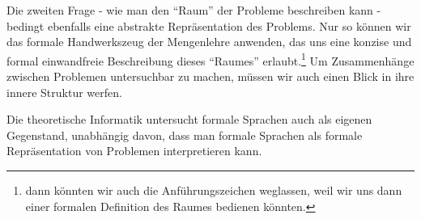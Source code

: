 Die zweiten Frage - wie man den ``Raum'' der Probleme beschreiben kann -
bedingt ebenfalls eine abstrakte Repräsentation des Problems.
Nur so können wir das formale Handwerkszeug der Mengenlehre anwenden,
das uns eine konzise und formal einwandfreie Beschreibung dieses ``Raumes'' erlaubt.\footnote{
dann könnten wir auch die Anführungszeichen weglassen, weil wir uns dann einer formalen Definition des Raumes
bedienen könnten.}
Um Zusammenhänge zwischen Problemen untersuchbar zu machen,
müssen wir auch einen Blick in ihre innere Struktur werfen.


Die theoretische Informatik untersucht formale Sprachen auch als eigenen Gegenstand,
unabhängig davon, dass man formale Sprachen als formale Repräsentation von Problemen
interpretieren kann.



